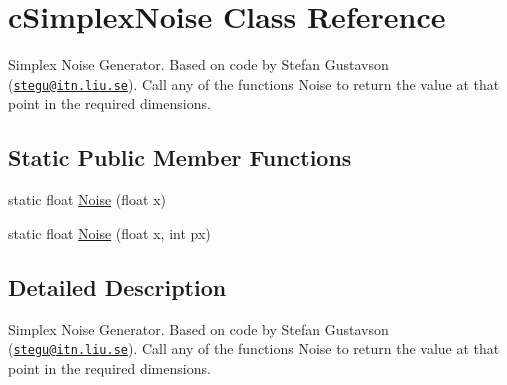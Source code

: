 \hypertarget{classc_simplex_noise}{
\section{cSimplexNoise Class Reference}
\label{classc_simplex_noise}
}


Simplex Noise Generator. Based on code by Stefan Gustavson (\href{mailto:stegu@itn.liu.se}{\tt stegu@itn.liu.se}). Call any of the functions Noise to return the value at that point in the required dimensions.  


\subsection*{Static Public Member Functions}
\begin{DoxyCompactItemize}
\item 
static float \hyperlink{classc_simplex_noise_a94e3ee837f446e9257df2850b8373397}{Noise} (float x)
\item 
static float \hyperlink{classc_simplex_noise_a3bea78aeb9c42b941c22513996a450ff}{Noise} (float x, int px)
\end{DoxyCompactItemize}


\subsection{Detailed Description}
Simplex Noise Generator. Based on code by Stefan Gustavson (\href{mailto:stegu@itn.liu.se}{\tt stegu@itn.liu.se}). Call any of the functions Noise to return the value at that point in the required dimensions. 


